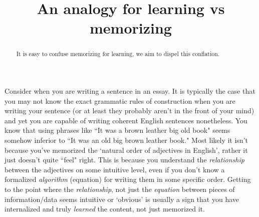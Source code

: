\documentclass{ximeraXloud}
\title{An analogy for learning vs memorizing}
\begin{document}
\begin{abstract}
It is easy to confuse memorizing for learning, we aim to dispel this conflation.
\end{abstract}
\maketitle

Consider when you are writing a sentence in an essay. It is typically the case that you may not know the exact grammatic rules of construction when you are writing your sentence (or at least they probably aren't in the front of your mind) and yet you are capable of writing coherent English sentences nonetheless. You know that using phrases like ``It was a brown leather big old book" seems somehow inferior to ``It was an old big brown leather book." Most likely it isn't because you've memorized the `natural order of adjectives in English', rather it just doesn't quite ``feel" right. This is because you understand the \textit{relationship} between the adjectives on some intuitive level, even if you don't know a formalized \textit{algorithm} (equation) for writing them in some specific order. Getting to the point where the \textit{relationship}, not just the \textit{equation} between pieces of information/data seems intuitive or `obvious' is usually a sign that you have internalized and truly \textit{learned} the content, not just memorized it.
\end{document}
